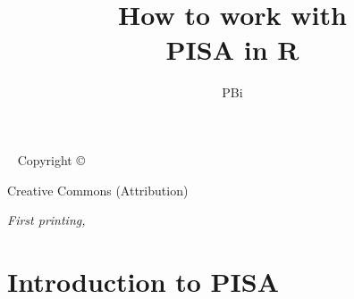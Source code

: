 \documentclass{tufte-book}
\title{ How to work with \\ PISA in R}
\author[PBi]{PBi}
\begin{document}
\frontmatter
%

\maketitle


\newpage
\begin{fullwidth}
~\vfill
\thispagestyle{empty}
\setlength{\parindent}{0pt}
\setlength{\parskip}{\baselineskip}
Copyright \copyright\ \the\year\ \thanklessauthor

\par{}

\par{}

\par Creative Commons (Attribution)

\par\textit{First printing, \monthyear}
\end{fullwidth}

\tableofcontents



%

\cleardoublepage

\chapter{Introduction to PISA}
\label{sec:introToPISA}

\end{document}
